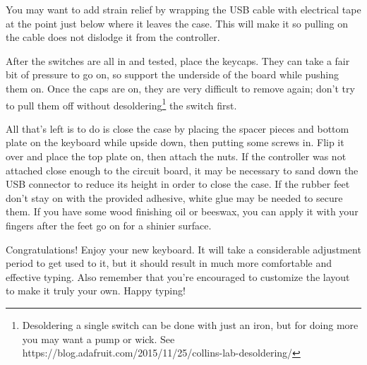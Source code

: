 \documentclass[landscape,twocolumn]{article}
\begin{document}
\vspace{1em}

You may want to add strain relief by wrapping the USB cable with
electrical tape at the point just below where it leaves the case. This
will make it so pulling on the cable does not dislodge it from the
controller.

\vspace{1em}

After the switches are all in and tested, place the keycaps. They can
take a fair bit of pressure to go on, so support the underside of the
board while pushing them on. Once the caps are on, they are very
difficult to remove again; don't try to pull them off without
desoldering\footnote{Desoldering a single switch can be done with just
  an iron, but for doing more you may want a pump or wick. See
  https://blog.adafruit.com/2015/11/25/collins-lab-desoldering/} the
switch first.

\vspace{1em}

All that's left is to do is close the case by placing the spacer
pieces and bottom plate on the keyboard while upside down, then
putting some screws in. Flip it over and place the top plate on, then
attach the nuts. If the controller was not attached close enough to
the circuit board, it may be necessary to sand down the USB connector
to reduce its height in order to close the case. If the rubber feet
don't stay on with the provided adhesive, white glue may be needed to
secure them. If you have some wood finishing oil or beeswax, you can
apply it with your fingers after the feet go on for a shinier surface.

\vspace{1em}

Congratulations! Enjoy your new keyboard. It will take a
considerable adjustment period to get used to it, but it should result
in much more comfortable and effective typing. Also remember that
you're encouraged to customize the layout to make it truly your
own. Happy typing!
\end{document}
